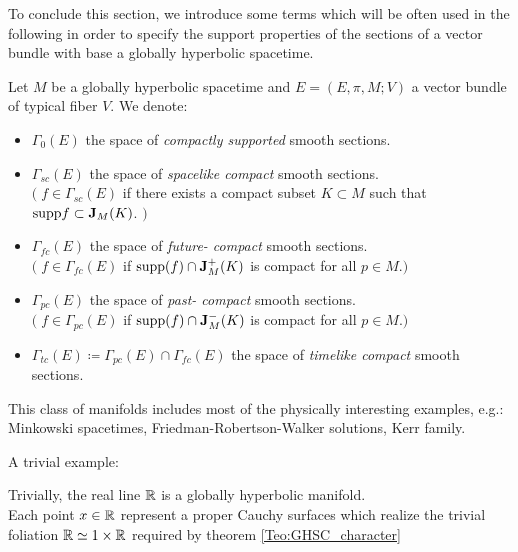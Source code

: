 \documentclass[a4paper,12pt]{scrartcl}    %
\begin{document}
		To conclude this section, we introduce some terms which will be often used in the following in order to
specify the support properties of the sections of a vector bundle with base a globally hyperbolic spacetime.
		\begin{notationfix}
		Let $M$ be a globally hyperbolic spacetime and $E=(E,\pi,M;V)$ a vector bundle of typical fiber $V$.
		We denote:
		\begin{itemize}
			\item $\Gamma_0(E)$ the space of \emph{compactly supported} smooth sections.
			\item $\Gamma_{sc}(E)$  the space of \emph{spacelike compact} smooth sections.\\
				$\big(\; f\in \Gamma_{sc}(E)$ if there exists a compact subset $K \subset M$  such that $\textrm{supp} f \subset \mathbf{J}_M(K)$. $\big)$
			\item  $\Gamma_{fc}(E) $ the space of \emph{future- compact} smooth sections.\\
				$\big(\; f\in \Gamma_{fc}(E) $ if  $\textrm{supp}(f) \cap  \mathbf{J}^+_M(K)$ is compact for all $p\in M$.$\big)$
			\item  $\Gamma_{pc}(E) $ the space of \emph{past- compact} smooth sections.\\
				$\big(\; f\in \Gamma_{pc}(E) $ if  $\textrm{supp}(f) \cap  \mathbf{J}^-_M(K)$ is compact for all $p\in M$.$\big)$
			\item $\Gamma_{tc}(E) \coloneqq \Gamma_{pc}(E) \cap \Gamma_{fc}(E) $ the space of \emph{timelike compact} smooth sections.
		\end{itemize}
		\end{notationfix}
		
		This class of manifolds includes most of the physically interesting examples, e.g.: Minkowski spacetimes, Friedman-Robertson-Walker solutions, Kerr family. \cite{advances}
					
			A trivial example:		
			\begin{example}
				Trivially, the real line $\mathbb{R}$ is a globally hyperbolic manifold.
				\\
				Each point $x\in \mathbb{R}$ represent a proper Cauchy surfaces which realize the trivial foliation $\mathbb{R} \simeq 1\times \mathbb{R} $ required by theorem \ref{Teo:GHSC_character}
			\end{example}
		
		
\end{document}
